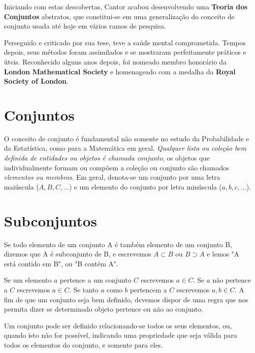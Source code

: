 Iniciando com estas descobertas, Cantor acabou desenvolvendo uma \textbf{Teoria dos Conjuntos} abstratos, que constitui-se em uma generalização do conceito de conjunto usada até hoje em vários ramos de pesquisa. \vskip0.3cm


Perseguido e criticado por sua tese, teve a saúde mental comprometida. Tempos depois, seus métodos foram assimilados e se mostraram perfeitamente práticos e úteis. Reconhecido alguns anos depois, foi nomeado membro honorário da \textbf{London Mathematical Society} e homenageado com a medalha da \textbf{Royal Society of London}.\vskip0.3cm



\section{Conjuntos}

O conceito de conjunto é fundamental não somente no estudo da
Probabilidade e da Estatística, como para a Matemática em geral.
\emph{Qualquer lista ou coleção bem definida de entidades ou
objetos é chamada conjunto}, os objetos que individualmente formam
ou compõem a coleção ou conjunto são chamados \emph{elementos ou
membros}. Em geral, denota-se um conjunto por uma letra maiúscula
($A,B,C,...$) e um elemento do conjunto por letra minúscula
($a,b,c,...$).\vskip0.3cm

\section{Subconjuntos}

Se todo elemento de um conjunto A é também elemento de um conjunto
B, dizemos que A é subconjunto de B, e escrevemos $A \subset B$
ou $B \supset A$ e lemos "A está contido em B", ou "B contém
A".\vskip0.3cm

Se um elemento $a$ pertence a um conjunto $C$ escrevemos $a \in C$. Se $a$ não pertence a $C$ escrevemos $a \in C$. Se tanto $a$ como $b$ pertencem a $C$ escrevemos $a,b \in C$. A fim de que um conjunto seja bem definido, devemos dispor de uma regra que nos permita dizer se determinado objeto pertence ou não ao conjunto.\vskip0.3cm

Um conjunto pode ser definido relacionando-se todos os seus elementos, ou, quando isto não for possível, indicando uma propriedade que seja válida para todos os elementos do conjunto, e somente para eles.\vskip0.3cm



